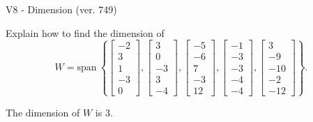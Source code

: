 \begin{exercise}
  \begin{exerciseTitle}V8 - Dimension (ver. 749)\end{exerciseTitle}
  \begin{exerciseStatement}
    Explain how to find the dimension of 
\[W=\mathrm{span}\ \left\{\left[\begin{array}{r}
-2 \\
3 \\
1 \\
-3 \\
0
\end{array}\right] , \left[\begin{array}{r}
3 \\
0 \\
-3 \\
3 \\
-4
\end{array}\right] , \left[\begin{array}{r}
-5 \\
-6 \\
7 \\
-3 \\
12
\end{array}\right] , \left[\begin{array}{r}
-1 \\
-3 \\
-3 \\
-4 \\
-4
\end{array}\right] , \left[\begin{array}{r}
3 \\
-9 \\
-10 \\
-2 \\
-12
\end{array}\right]\right\}.\]



  \end{exerciseStatement}
  \begin{exerciseAnswer}
   The dimension of \(W\) is  \(3\).
  


  \end{exerciseAnswer}
\end{exercise}